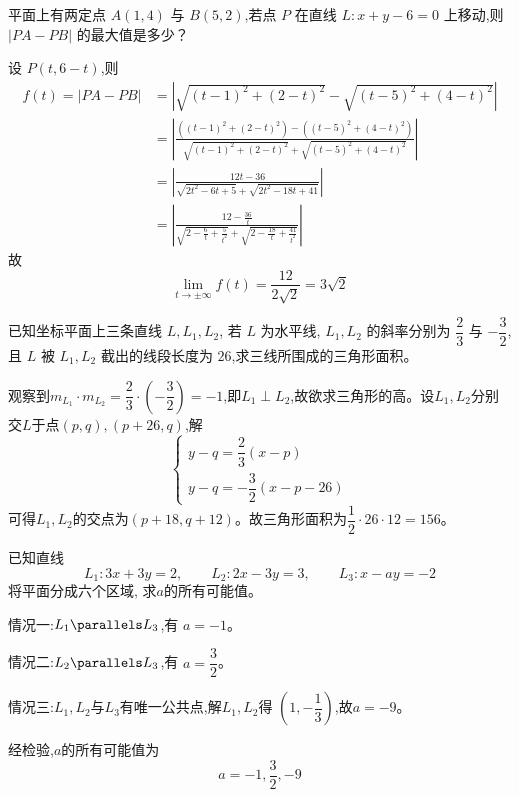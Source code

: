 \begin{questions}
    \question 平面上有两定点 $A(1,4)$ 与 $B(5,2)$,若点 $P$ 在直线 $L: x+y-6=0$ 上移动,则 $|PA-PB|$ 的最大值是多少？
    \begin{solution}
        设 $P(t, 6 - t)$,则
        \begin{align*}
        f(t) = |PA - PB| 
        &= \left| \sqrt{(t - 1)^2 + (2 - t)^2} - \sqrt{(t - 5)^2 + (4 - t)^2} \right|\\
        &= \left| \frac{((t - 1)^2 + (2 - t)^2) -((t - 5)^2 + (4 - t)^2)}{
        \sqrt{(t - 1)^2 + (2 - t)^2} + \sqrt{(t - 5)^2 + (4 - t)^2}} \right|\\
        &= \left| \frac{12t - 36}{\sqrt{2t^2 - 6t + 5} + \sqrt{2t^2 - 18t + 41}} \right| \\
        &= \left| \frac{12 - \frac{36}{t}}{\sqrt{2 - \frac6t + \frac{5}{t^2}} + \sqrt{2 - \frac{18}{t} + \frac{41}{t^2}}} \right|
        \end{align*}
        故
        \[
        \lim_{t \to \pm\infty} f(t) = \frac{12}{2\sqrt{2}} = 3\sqrt{2}
        \]
    \end{solution}

    \question 已知坐标平面上三条直线 $L, L_1, L_2$, 若 $L$ 为水平线, $L_1, L_2$ 的斜率分别为 $\dfrac{2}{3}$ 与 $-\dfrac{3}{2}$, 且 $L$ 被 $L_1, L_2$ 截出的线段长度为 $26$,求三线所围成的三角形面积。
    \begin{solution}
        观察到$ m_{L_1}\cdot m_{L_2}=\dfrac{2}{3} \cdot \left(-\dfrac{3}{2}\right)=-1$,即$L_1 \perp L_2$,故欲求三角形的高。设$L_1, L_2$分别交$L$于点$(p,q),(p+26,q)$,解
        \[
        \begin{cases}
        y-q=\dfrac{2}{3}(x-p)\\ y-q=-\dfrac{3}{2}(x-p-26)
        \end{cases}
        \]
        可得$L_1, L_2$的交点为$(p+18,q+12)$。故三角形面积为$\dfrac{1}{2} \cdot 26 \cdot 12=156$。
    \end{solution}    
        
    \question 已知直线
    \[
    L_1: 3x + 3y = 2,\qquad
    L_2: 2x - 3y = 3,\qquad
    L_3: x - ay = -2
    \]
    将平面分成六个区域, 求$a$的所有可能值。
    \begin{solution}
        情况一:$L_1 \parallels L_3$,有 $a=-1$。

        情况二:$L_2 \parallels L_3$,有 $a=\dfrac{3}{2}$。

        情况三:$L_1,L_2$与$L_3$有唯一公共点,解$L_1,L_2$得 $\left(1,-\dfrac{1}{3}\right)$,故$a=-9$。

        经检验,$a$的所有可能值为 
        \[
        a = -1, \frac{3}{2}, -9
        \]
    \end{solution} 


\end{questions}
